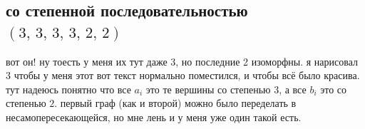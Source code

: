 \documentclass{article}
\begin{document}
  \subsection{со степенной последовательностью $(3,\, 3,\, 3,\, 3,\, 2,\, 2)$}
  \begin{figure}
    \vspace{-.5cm}
    \hfill
    \vspace{-.5cm}
  \end{figure}
  вот он!
  ну тоесть у меня их тут даже 3, но последние 2 изоморфны.
  я нарисовал 3 чтобы у меня этот вот текст нормально поместился, и чтобы всё было красива.
  тут надеюсь понятно что все $a_i$ это те вершины со степенью $3$, а все $b_i$ это со степенью $2$.
  первый граф (как и второй) можно было переделать в несамопересекающейся, но мне лень и у меня уже один такой есть.
\end{document}
